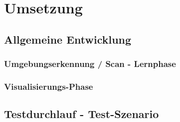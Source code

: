 

\chapter{Umsetzung}
\label{chap:Umsetzung}

\section{Allgemeine Entwicklung} %
\label{chap:topic4.1}
\subsection{Umgebungserkennung / Scan - Lernphase}
\subsection{Visualisierungs-Phase} 

\section{Testdurchlauf - Test-Szenario}
\label{chap:testdurchlauf}

